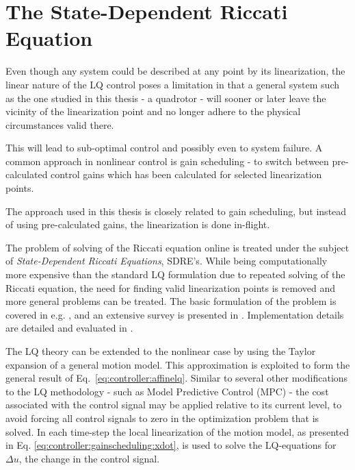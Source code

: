 \section{The State-Dependent Riccati Equation}%
\label{sec:controller:gainscheduling}
    Even though any system could be described at any point by its linearization,
    the linear nature of the LQ control poses a limitation in that
    a general system such as the one studied in this thesis - a quadrotor - will
    sooner or later leave the vicinity of the linearization point and no
    longer adhere to the physical circumstances valid there.

    This will lead to sub-optimal control and possibly even to system failure.
    A common approach in nonlinear control is gain scheduling - to switch
    between pre-calculated control gains which has been calculated for
    selected linearization points.

    The approach used in this thesis is closely related to gain scheduling,
    but instead of using pre-calculated gains, the linearization is done
    in-flight.

    The problem of solving of the Riccati equation  online is treated under
    the subject of \textit{State-Dependent Riccati Equations}, SDRE's.
    While being computationally more expensive than the standard LQ formulation
    due to repeated solving of the Riccati equation, the need
    for finding valid linearization points is removed and more general problems can be treated.
    The basic formulation of the problem is covered in e.g. \citep{Rantzer99piecewiselinear},
    and an extensive survey is presented in \citep{Tayfun08sdresurvey}.
    Implementation details are detailed and evaluated in \citep{Erdem_analysisand,Benner98acceleratingnewton's,10.1109/MED.2006.328740}.

    The LQ theory can be extended to the nonlinear case by using the Taylor
    expansion of a general motion model. This approximation is exploited to form the general
    result of Eq.~\eqref{eq:controller:affinelq}.
    Similar to several other modifications to the LQ methodology - such as
    Model Predictive Control (MPC) - the cost associated with the control signal
    may be applied relative to its current level, to avoid
    forcing all control signals to zero in the optimization problem that is solved.
    In each time-step the local linearization of the motion model, as presented in
    Eq. \eqref{eq:controller:gainscheduling:xdot}, is used to solve the LQ-equations
    for $\Delta u$, the change in the control signal.

